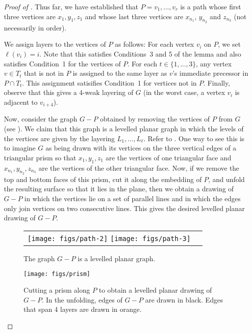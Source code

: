 \documentclass{patmorin}
\begin{document}
\begin{proof}[Proof of ]
  Thus far, we have established that $P=v_1,\ldots,v_r$ is a path whose
  first three vertices are $x_1,y_1,z_1$ and whose last three vertices
  are $x_{n_1}$, $y_{n_2}$ and $z_{n_3}$ (not necessarily in order).

  We assign layers to the vertices of $P$ as follows: For each
  vertex $v_i$ on $P$, we set $\ell(v_i)=i$.  Note that this satisfies
  Conditions~3 and 5 of the lemma and also satisfies Condition~1 for the
  vertices of $P$.  For each $t\in\{1,\ldots,3\}$, any vertex $v\in T_t$
  that is not in $P$ is assigned to the same layer as $v$'s immediate
  precessor in $P\cap T_t$.  This assignment satisifies Condition~1 for
  vertices not in $P$.  Finally, observe that this gives a 4-weak layering
  of $G$ (in the worst case, a vertex $v_i$ is adjacent to $v_{i+4}$).

  Now, consider the graph $G-P$ obtained by removing the vertices of $P$
  from $G$ (see ).  We claim that this graph is a levelled
  planar graph \cite{bannister.devanny.ea:track} in which the levels of
  the vertices are given by the layering $L_1,\ldots,L_\ell$.  Refer to
  .  One way to see this is to imagine $G$ as being drawn
  with its vertices on the three vertical edges of a triangular prism
  so that $x_1,y_1,z_1$ are the vertices of one triangular face and
  $x_{n_1},y_{n_2},z_{n_3}$ are the vertices of the other triangular
  face.  Now, if we remove the top and bottom faces of this prism,
  cut it along the embedding of $P$, and unfold the resulting surface
  so that it lies in the plane, then we obtain a drawing of $G-P$ in
  which the vertices lie on a set of parallel lines and in which the
  edges only join vertices on two consecutive lines.  This gives the
  desired levelled planar drawing of $G-P$.

  \begin{figure}
  \begin{center}
  \begin{tabular}{cc}
  \texttt{[image: figs/path-2]}
  \texttt{[image: figs/path-3]}
  \end{tabular}
  \end{center}
  \caption{The graph $G-P$ is a levelled planar graph.}
  \end{figure}


  \begin{figure}
     \begin{center}
        \texttt{[image: figs/prism]}
     \end{center}
     \caption{Cutting a prism along $P$ to obtain a levelled planar
      drawing of $G-P$.
      In the unfolding, edges of $G-P$ are drawn in black. Edges that
      span 4 layers are drawn in orange.}
  \end{figure}


\end{proof}
\end{document}

